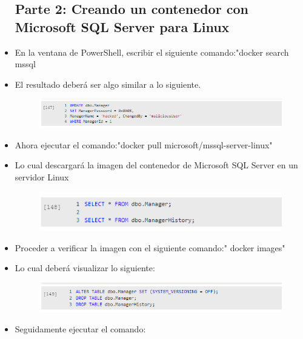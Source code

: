 \begin{itemize}
\subsection{Parte 2: Creando un contenedor con Microsoft SQL Server para Linux}
	\item En la ventana de PowerShell, escribir el siguiente comando:"docker search mssql      
	\item El resultado deberá ser algo similar a lo siguiente.
                     \begin{figure}[H]
		\begin{center}
		\includegraphics[width=15cm]{./Imagenes/s8}
		\end{center}
		\end{figure}   
	\item Ahora ejecutar el comando:"docker pull microsoft/mssql-server-linux"
	\item Lo cual descargará la imagen del contenedor de Microsoft SQL Server en un servidor Linux
                     \begin{figure}[H]
		\begin{center}
		\includegraphics[width=15cm]{./Imagenes/s9}
		\end{center}
		\end{figure}   
          \item Proceder a verificar la imagen con el siguiente comando:" docker images"
	\item Lo cual deberá visualizar lo siguiente:
                     \begin{figure}[H]
		\begin{center}
		\includegraphics[width=15cm]{./Imagenes/s10}
		\end{center}
		\end{figure}   
	\item Seguidamente ejecutar el comando:

\end{itemize}
